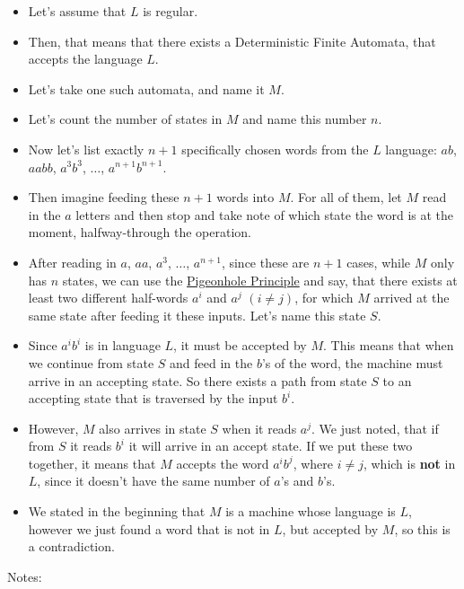 \begin{itemize}
    \item Let's assume that $L$ is regular.
    \item Then, that means that there exists a Deterministic Finite Automata, that accepts the language $L$.
    \item Let's take one such automata, and name it $M$.
    \item Let's count the number of states in $M$ and name this number $n$.
    \item Now let's list exactly $n+1$ specifically chosen words from the $L$ language: $ab$, $aabb$, $a^3b^3$, $\dots$, $a^{n+1}b^{n+1}$.
    \item Then imagine feeding these $n+1$ words into $M$. For all of them, let $M$ read in the $a$ letters and then stop and take note of which state the word is at the moment, halfway-through the operation.
    \item After reading in $a$, $aa$, $a^3$, $\dots$, $a^{n+1}$, since these are $n+1$ cases, while $M$ only has $n$ states, we can use the \href{https://en.wikipedia.org/wiki/Pigeonhole_principle}{Pigeonhole Principle} and say, that there exists at least two different half-words $a^i$ and $a^j$ $(i\neq{}j)$, for which $M$ arrived at the same state after feeding it these inputs. Let's name this state $S$.
    \item Since $a^ib^i$ is in language $L$, it must be accepted by $M$. This means that when we continue from state $S$ and feed in the $b$'s of the word, the machine must arrive in an accepting state. So there exists a path from state $S$ to an accepting state that is traversed by the input $b^i$.
    \item However, $M$ also arrives in state $S$ when it reads $a^j$. We just noted, that if from $S$ it reads $b^i$ it will arrive in an accept state. If we put these two together, it means that $M$ accepts the word $a^ib^j$, where $i\neq{}j$, which is \textbf{not} in $L$, since it doesn't have the same number of $a$'s and $b$'s.
    \item We stated in the beginning that $M$ is a machine whose language is $L$, however we just found a word that is not in $L$, but accepted by $M$, so this is a contradiction.
\end{itemize}

Notes:

